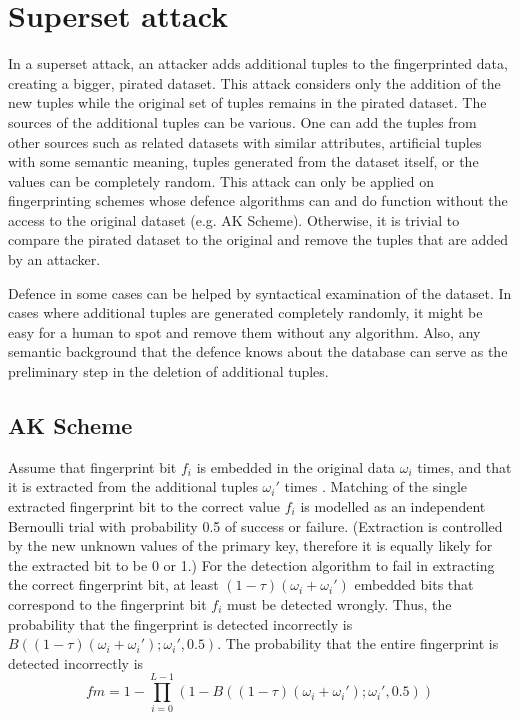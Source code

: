 \section{Superset attack}\label{subsec:superset-attack}

In a superset attack, an attacker adds additional tuples to the fingerprinted data, creating a bigger, pirated dataset.
This attack considers only the addition of the new tuples while the original set of tuples remains in the pirated dataset.
The sources of the additional tuples can be various.
One can add the tuples from other sources such as related datasets with similar attributes, artificial tuples with some semantic meaning, tuples generated from the dataset itself, or the values can be completely random. 
This attack can only be applied on fingerprinting schemes whose defence algorithms can and do function without the access to the original dataset (e.g. AK Scheme).
Otherwise, it is trivial to compare the pirated dataset to the original and remove the tuples that are added by an attacker.


Defence in some cases can be helped by syntactical examination of the dataset. 
In cases where additional tuples are generated completely randomly, it might be easy for a human to spot and remove them without any algorithm.
Also, any semantic background that the defence knows about the database can serve as the preliminary step in the deletion of additional tuples.


\subsection{AK Scheme}\label{subsec:superset-attack-ak}
Assume that fingerprint bit $f_i$ is embedded in the original data $\omega_i$ times, and that it is extracted from the additional tuples $\omega_i'$ times \cite{li2005fingerprinting}. 
Matching of the single extracted fingerprint bit to the correct value $f_i$ is modelled as an independent Bernoulli trial with probability 0.5 of success or failure.
(Extraction is controlled by the new unknown values of the primary key, therefore it is equally likely for the extracted bit to be 0 or 1.)
For the detection algorithm to fail in extracting the correct fingerprint bit, at least $(1-\tau)(\omega_i+\omega_i')$ embedded bits that correspond to the fingerprint bit $f_i$ must be detected wrongly.
Thus, the probability that the fingerprint is detected incorrectly is $B((1-\tau)(\omega_i+\omega_i');\omega_i',0.5)$.
The probability that the entire fingerprint is detected incorrectly is 
\begin{equation} \label{eq:superset-attack}
    fm = 1 - \prod_{i=0}^{L-1}(1-B((1-\tau)(\omega_i+\omega_i');\omega_i',0.5))
\end{equation}

